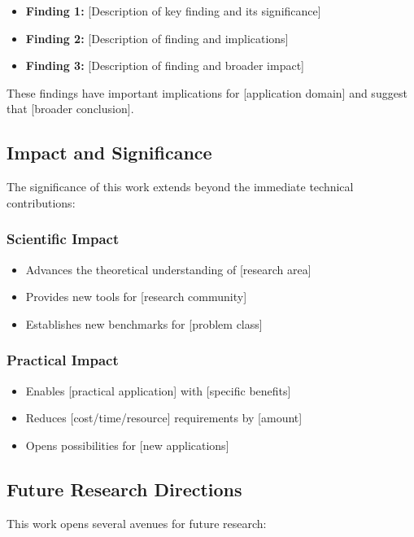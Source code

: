 \begin{itemize}
    \item \textbf{Finding 1:} [Description of key finding and its significance]
    \item \textbf{Finding 2:} [Description of finding and implications]
    \item \textbf{Finding 3:} [Description of finding and broader impact]
\end{itemize}

These findings have important implications for [application domain] and suggest that [broader conclusion].

\subsection{Impact and Significance}

The significance of this work extends beyond the immediate technical contributions:

\subsubsection{Scientific Impact}
\begin{itemize}
    \item Advances the theoretical understanding of [research area]
    \item Provides new tools for [research community]
    \item Establishes new benchmarks for [problem class]
\end{itemize}

\subsubsection{Practical Impact}
\begin{itemize}
    \item Enables [practical application] with [specific benefits]
    \item Reduces [cost/time/resource] requirements by [amount]
    \item Opens possibilities for [new applications]
\end{itemize}

\subsection{Future Research Directions}

This work opens several avenues for future research:

